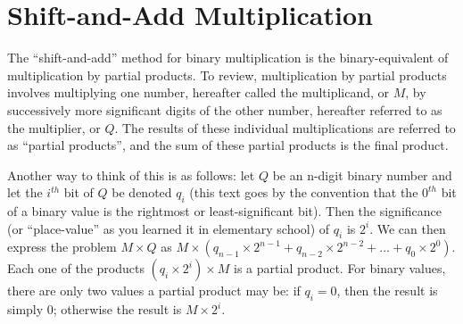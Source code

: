 \documentclass{article}
\begin{document}
\section{Shift-and-Add Multiplication}
The ``shift-and-add'' method for binary multiplication is the binary-equivalent of multiplication by partial products.
To review, multiplication by partial products involves multiplying one number, hereafter called the multiplicand, or $M$, by successively more significant digits of the other number, hereafter referred to as the multiplier, or $Q$.
The results of these individual multiplications are referred to as ``partial products'', and the sum of these partial products is the final product.

Another way to think of this is as follows: let $Q$ be an n-digit binary number and let the $i^{th}$ bit of $Q$ be denoted $q_i$ (this text goes by the convention that the $0^{th}$ bit of a binary value is the rightmost or least-significant bit).
Then the significance (or ``place-value'' as you learned it in elementary school) of $q_i$ is $2^i$.
We can then express the problem $M \times Q$ as $M \times (q_{n-1} \times 2^{n-1} + q_{n-2} \times 2^{n-2} + \ldots + q_{0} \times 2^{0})$.
Each one of the products $(q_i \times 2^{i}) \times M$ is a partial product.
For binary values, there are only two values a partial product may be: if $q_i = 0$, then the result is simply $0$; otherwise the result is $M \times 2^i$.
\end{document}
